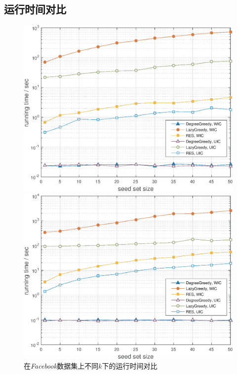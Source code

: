 \subsection{运行时间对比}
\label{subsec:runningTime}
\begin{figure}[!ht]
   \begin{minipage}{0.48\textwidth}
     \centering
     \includegraphics[width=\linewidth]{figures/facebookTime.eps}
     \caption{在\textit{Facebook}数据集上不同$k$下的运行时间对比}
     \label{fig:facebookTime}
   \end{minipage}
   \hfill
   \begin {minipage}{0.48\textwidth}
     \centering
     \includegraphics[width=\linewidth]{figures/hepPhTime.eps}

\end{minipage}
\end{figure}
